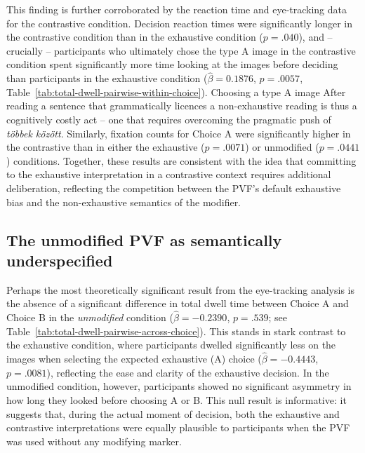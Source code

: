 \documentclass[a4paper, ruler]{CUP-JNL-LIN}%
\begin{document}
This finding is further corroborated by the reaction time and eye-tracking data for the contrastive condition. Decision reaction times were significantly longer in the contrastive condition than in the exhaustive condition ($p = .040$), and -- crucially -- participants who ultimately chose the type A image in the contrastive condition spent significantly more time looking at the images before deciding than participants in the exhaustive condition ($\hat\beta = 0.1876$, $p = .0057$, Table~\ref{tab:total-dwell-pairwise-within-choice}). Choosing a type A image After reading a sentence that grammatically licences a non-exhaustive reading is thus a cognitively costly act -- one that requires overcoming the pragmatic push of \textit{többek között}. Similarly, fixation counts for Choice A were significantly higher in the contrastive than in either the exhaustive ($p = .0071$) or unmodified ($p = .0441$) conditions. Together, these results are consistent with the idea that committing to the exhaustive interpretation in a contrastive context requires additional deliberation, reflecting the competition between the PVF's default exhaustive bias and the non-exhaustive semantics of the modifier.



\subsection{The unmodified PVF as semantically underspecified}

Perhaps the most theoretically significant result from the eye-tracking analysis is the absence of a significant difference in total dwell time between Choice A and Choice B in the \textit{unmodified} condition ($\hat\beta = -0.2390$, $p = .539$; see Table~\ref{tab:total-dwell-pairwise-across-choice}). This stands in stark contrast to the exhaustive condition, where participants dwelled significantly less on the images when selecting the expected exhaustive (A) choice ($\hat\beta = -0.4443$, $p = .0081$), reflecting the ease and clarity of the exhaustive decision. In the unmodified condition, however, participants showed no significant asymmetry in how long they looked before choosing A or B. This null result is informative: it suggests that, during the actual moment of decision, both the exhaustive and contrastive interpretations were equally plausible to participants when the PVF was used without any modifying marker.
\end{document}
